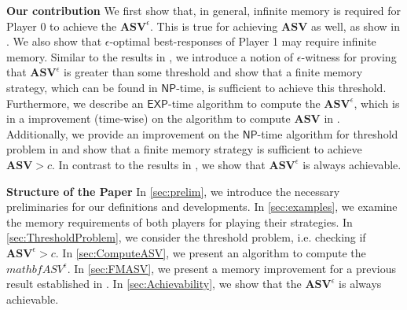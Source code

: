 \textbf{\bf Our contribution} We first show that, in general, infinite memory is required for Player 0 to achieve the $\mathbf{ASV}^{\epsilon}$. This is true for achieving $\mathbf{ASV}$ as well, as show in \cite{FGR20}. We also show that $\epsilon$-optimal best-responses of Player 1 may require infinite memory. Similar to the results in \cite{FGR20}, we introduce a notion of $\epsilon$-witness for proving that $\mathbf{ASV}^{\epsilon}$ is greater than some threshold and show that a finite memory strategy, which can be found in $\mathsf{NP}$-time, is sufficient to achieve this threshold. Furthermore, we describe an $\mathsf{EXP}$-time algorithm to compute the $\mathbf{ASV}^{\epsilon}$, which is in a improvement (time-wise) on the algorithm to compute $\mathbf{ASV}$ in \cite{FGR20}. Additionally, we provide an improvement on the $\mathsf{NP}$-time algorithm for threshold problem in \cite{FGR20} and show that a finite memory strategy is sufficient to achieve $\mathbf{ASV} > c$. In contrast to the results in \cite{FGR20}, we show that $\mathbf{ASV}^{\epsilon}$ is always achievable.

\textbf{Structure of the Paper} In \cref{sec:prelim}, we introduce the necessary preliminaries for our definitions and developments. In \cref{sec:examples}, we examine the memory requirements of both players for playing their strategies. In \cref{sec:ThresholdProblem}, we consider the threshold problem, i.e. checking if $\mathbf{ASV}^{\epsilon} > c$. In \cref{sec:ComputeASV}, we present an algorithm to compute the $mathbf{ASV}^{\epsilon}$. In \cref{sec:FMASV}, we present a memory improvement for a previous result established in \cite{FGR20}. In \cref{sec:Achievability}, we show that the $\mathbf{ASV}^{\epsilon}$ is always achievable.